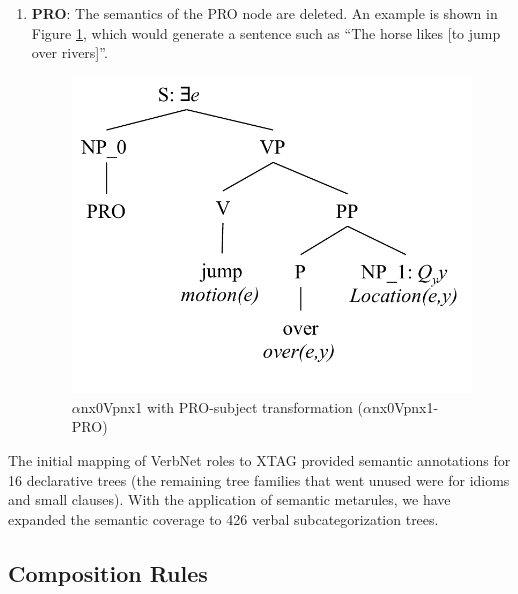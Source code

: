 \documentclass[11pt,a4paper]{article}
\begin{document}
\begin{enumerate}
    \item \textbf{PRO}: The semantics of the PRO node are deleted. An example is shown in Figure \ref{fig:jump_pro_semantics}, which would generate a sentence such as ``The horse likes [to jump over rivers]''.

    \begin{figure}[H]
    \begin{centering}
    \includegraphics[width=.6 \linewidth ]{resources/ch5_resources/jump_pro_semantics.pdf}
    \caption{$\alpha$nx0Vpnx1 with PRO-subject transformation ($\alpha$nx0Vpnx1-PRO)}
    \label{fig:jump_pro_semantics}
    \end{centering}
    \end{figure}

\end{enumerate}


The initial mapping of VerbNet roles to XTAG provided semantic annotations for
16 declarative trees (the remaining tree families that went unused were for idioms and small clauses).
With the application of semantic metarules, we have expanded the semantic coverage to 426 verbal subcategorization trees.

\pagebreak
\subsection{Composition Rules} 
\end{document}
